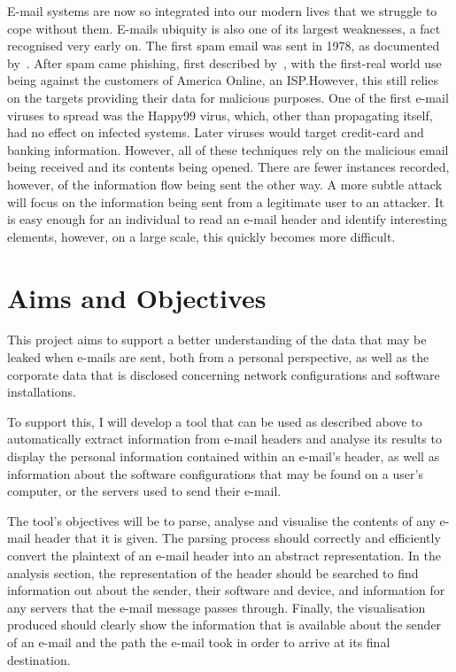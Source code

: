 \documentclass[a4paper,DIV=12,BCOR=7mm,abstract=yes,twoside,11pt]{scrreprt}
\begin{document}
E-mail systems are now so integrated into our modern lives that we struggle to
cope without them.  E-mails ubiquity is also one of its largest weaknesses, a
fact recognised very early on.  The first spam email was sent in 1978, as
documented by~\cite{templeton}.  After spam came phishing, first described
by~\cite{felix1987system}, with the first-real world use being against the
customers of America Online, an ISP.\@  However, this still relies on the
targets providing their data for malicious purposes. One of the first e-mail
viruses to spread was the Happy99 virus, which, other than propagating itself,
had no effect on infected systems. Later viruses would target credit-card and
banking information. However, all of these techniques rely on the malicious
email being received and its contents being opened.  There are fewer instances
recorded, however, of the information flow being sent the other way.  A more
subtle attack will focus on the information being sent from a legitimate user
to an attacker. It is easy enough for an individual to read an e-mail header
and identify interesting elements, however, on a large scale, this quickly
becomes more difficult.

\section{Aims and Objectives}

This project aims to support a better understanding of the data that may be
leaked when e-mails are sent, both from a personal perspective, as well as the
corporate data that is disclosed concerning network configurations and software
installations.

To support this, I will develop a tool that can be used as described above to
automatically extract information from e-mail headers and analyse its results to
display the personal information contained within an e-mail's header, as well as
information about the software configurations that may be found on a user's
computer, or the servers used to send their e-mail.

The tool's objectives will be to parse, analyse and visualise the contents of
any e-mail header that it is given.  The parsing process should correctly and
efficiently convert the plaintext of an e-mail header into an abstract
representation.  In the analysis section, the representation of the header
should be searched to find information out about the sender, their software and
device, and information for any servers that the e-mail message passes through.
Finally, the visualisation produced should clearly show the information that is
available about the sender of an e-mail and the path the e-mail took in order to
arrive at its final destination.
\end{document}

